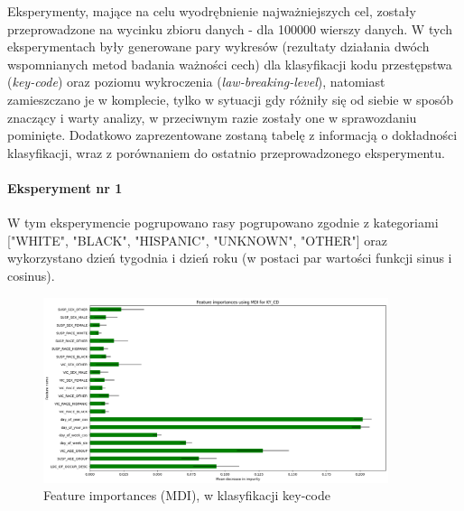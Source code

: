 \documentclass{classrep}
\begin{document}
{{{                Eksperymenty, mające na celu wyodrębnienie najważniejszych cel, zostały przeprowadzone na wycinku zbioru danych - dla 100000 wierszy danych. W tych eksperymentach były generowane pary wykresów (rezultaty działania dwóch wspomnianych metod badania ważności cech) dla klasyfikacji kodu przestępstwa (\textit{key-code}) oraz poziomu wykroczenia (\textit{law-breaking-level}), natomiast zamieszczano je w komplecie, tylko w sytuacji gdy różniły się od siebie w sposób znaczący i warty analizy, w przeciwnym razie zostały one w sprawozdaniu pominięte. Dodatkowo zaprezentowane zostaną tabelę z informacją o dokładności klasyfikacji, wraz z porównaniem do ostatnio przeprowadzonego eksperymentu.
                \paragraph{Eksperyment nr 1}{
                    W tym eksperymencie pogrupowano rasy pogrupowano zgodnie z kategoriami ["WHITE", "BLACK", "HISPANIC", "UNKNOWN", "OTHER"] oraz wykorzystano dzień tygodnia i dzień roku (w postaci par wartości funkcji sinus i cosinus).
                    \begin{figure}[!htbp]
                        \centering
                        \includegraphics[width=0.9\textwidth]{img/5.1.3/1/Feature importances using MDI for KY_CD.png}
                        \caption{Feature importances (MDI), w klasyfikacji key-code}
                        \label{goal_1_exp_1_imp_mdi_key}
                    \end{figure}
                    
}}}}
\end{document}
